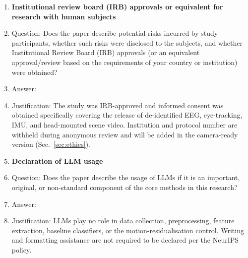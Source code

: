 \begin{enumerate}
\item {\bf Institutional review board (IRB) approvals or equivalent for research with human subjects}
    \item[] Question: Does the paper describe potential risks incurred by study participants, whether such risks were disclosed to the subjects, and whether Institutional Review Board (IRB) approvals (or an equivalent approval/review based on the requirements of your country or institution) were obtained?
    \item[] Answer: \answerYes{}
    \item[] Justification: The study was IRB-approved and informed consent was obtained specifically covering the release of de-identified EEG, eye-tracking, IMU, and head-mounted scene video. Institution and protocol number are withheld during anonymous review and will be added in the camera-ready version (Sec.~\ref{sec:ethics}).

\item {\bf Declaration of LLM usage}
    \item[] Question: Does the paper describe the usage of LLMs if it is an important, original, or non-standard component of the core methods in this research?
    \item[] Answer: \answerNA{}
    \item[] Justification: LLMs play no role in data collection, preprocessing, feature extraction, baseline classifiers, or the motion-residualisation control. Writing and formatting assistance are not required to be declared per the NeurIPS policy.

\end{enumerate}
